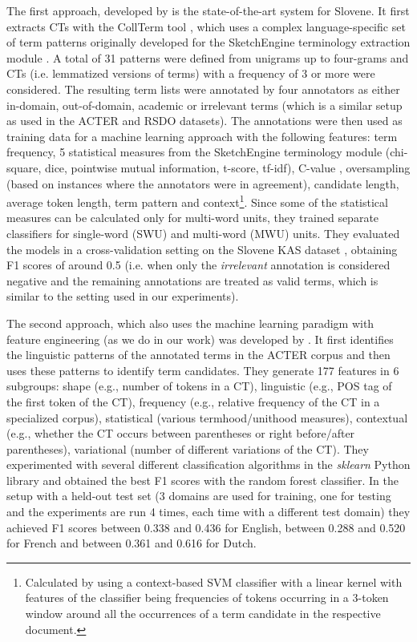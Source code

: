 The first approach, developed by \cite{ljubevsic2019kas} is the state-of-the-art system for Slovene. It first extracts CTs with the CollTerm tool \citep{pinnis2012term}, which uses a complex language-specific set of term patterns originally developed for the SketchEngine terminology extraction module \citep{fivser2016terminology}. A total of 31 patterns were defined from unigrams up to four-grams and CTs (i.e. lemmatized versions of terms) with a frequency of 3 or more were considered. The resulting term lists were annotated by four annotators as either in-domain, out-of-domain, academic or irrelevant terms (which is a similar setup as used in the ACTER and RSDO datasets). The annotations were then used as training data for a machine learning approach with the following features: term frequency, 5 statistical measures from the SketchEngine terminology module (chi-square, dice, pointwise mutual information, t-score, tf-idf), C-value \citep{frantzi2000automatic}, oversampling (based on instances where the annotators were in agreement), candidate length, average token length, term pattern and context\footnote{Calculated by using a context-based SVM classifier with a linear kernel with features of the classifier being frequencies of tokens occurring in a 3-token window around all the occurrences of a term candidate in the respective document.}. Since some of the statistical measures can be calculated only for multi-word units, they trained separate classifiers for single-word (SWU) and multi-word (MWU) units. They evaluated the models in a cross-validation setting on the Slovene KAS dataset \citep{11356/1198}, obtaining F1 scores of around 0.5 (i.e. when only the \textit{irrelevant} annotation is considered negative and the remaining annotations are treated as valid terms, which is similar to the setting used in our experiments). 

The second approach, which also uses the machine learning paradigm with feature engineering (as we do in our work) was developed by \cite{rigouts2021hamlet}. It first identifies the linguistic patterns of the annotated terms in the ACTER corpus and then uses these patterns to identify term candidates. They generate 177 features in 6 subgroups: shape (e.g., number of tokens in a CT), linguistic (e.g., POS tag of the first token of the CT), frequency (e.g., relative frequency of the CT in a specialized corpus), statistical (various termhood/unithood measures), contextual (e.g., whether the CT occurs between parentheses or right before/after parentheses), variational (number of different variations of the CT). They experimented with several different classification algorithms in the \textit{sklearn} Python library and obtained the best F1 scores with the random forest classifier. In the setup with a held-out test set (3 domains are used for training, one for testing and the experiments are run 4 times, each time with a different test domain) they achieved F1 scores between 0.338 and 0.436 for English, between 0.288 and 0.520 for French and between 0.361 and 0.616 for Dutch.